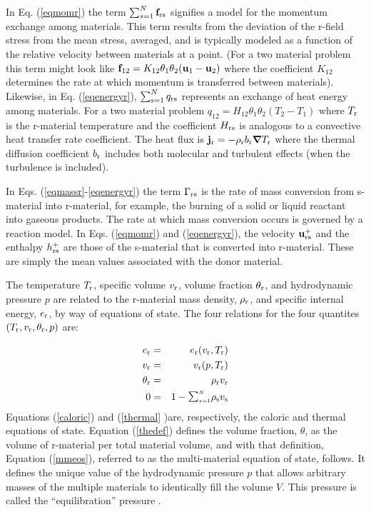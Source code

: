 In Eq. (\ref{eqmomr}) the term $\sum_{s=1}^{N}{\bf f}_{{\rm r}{\rm s}}$ signifies
a model for the momentum exchange among materials.  This term results from
the deviation of the r-field stress from the mean stress, averaged, and is
typically modeled as a function of the relative velocity between materials
at a point. (For a two material problem this term might look like ${\bf f}_{12}
= K_{12}\theta_1\theta_2({\bf u}_1 - {\bf u}_2)$ where the coefficient $K_{12}$
determines the rate at which momentum is transferred between materials).
Likewise, in Eq. (\ref{eqenergyr}), $\sum_{{\rm s}=1}^{N} q_{{\rm r}{\rm s}}$
represents an exchange of heat energy among materials.  For a two material
problem $q_{12} = H_{12}\theta_1\theta_2(T_2 - T_1)$ where $T_{\rm r}$ is the
r-material temperature and the coefficient $H_{{\rm r}{\rm s}}$ is analogous to a
convective heat transfer rate coefficient.  The heat flux is ${\bf j}_{\rm r} =
-\rho_{\rm r} b_{\rm r} \mbox{\boldmath $\nabla \!\!$ \unboldmath} T_{\rm r}$ where the thermal diffusion coefficient
$b_{\rm r}$ includes both molecular and turbulent effects (when the turbulence
is included).

In Eqs. (\ref{eqmassr}-\ref{eqenergyr}) the term $\Gamma_{{\rm r}{\rm s}}$ is
the rate of mass conversion from s-material into r-material, for example,
the burning of a solid or liquid reactant into gaseous products.  The rate at which
mass conversion occurs is governed by a reaction model.  In Eqs. (\ref{eqmomr})
and (\ref{eqenergyr}), the velocity ${\bf u}_{{\rm r}{\rm s}}^+$ and the enthalpy
$h_{{\rm r}{\rm s}}^+$ are those of the s-material that is converted into r-material.
These are simply the mean values associated with the donor material.

The temperature $T_{\rm r}$, specific volume $v_{\rm r}$, volume fraction
$\theta_{\rm r}$, and hydrodynamic pressure $p$ are related to the r-material
mass density, $\rho_{\rm r}$, and specific internal energy, $e_{\rm r}$, by way
of equations of state.  The four relations for the four quantites $(T_{\rm r},
v_{\rm r}, \theta_{\rm r}, p)$ are:

%
\begin{eqnarray}
e_\rmr &=& e_\rmr(v_\rmr, T_\rmr) \label{caloric} \\
v_\rmr &=& v_\rmr(p, T_\rmr) \label{thermal} \\
\theta_\rmr &=& \rho_\rmr v_\rmr \label{thedef} \\
0 &=& 1 - \SUM\rho_\rms v_\rms
\label{mmeos}
\end{eqnarray}
%
Equations (\ref{caloric}) and (\ref{thermal} )are, respectively, the caloric
and thermal equations of state.  Equation (\ref{thedef}) defines the volume
fraction, $\theta$, as the volume of r-material per total material volume,
and with that definition, Equation (\ref{mmeos}), referred to as the
multi-material equation of state, follows.  It defines the unique value of
the hydrodynamic pressure $p$ that allows arbitrary masses of the multiple
materials to identically fill the volume $V$.  This pressure is called the
``equilibration'' pressure \cite{kashiwaICE94}.

